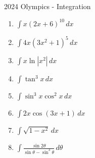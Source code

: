\documentclass[12pt, letterpaper]{article}
\begin{document}
2024 Olympics - Integration
\begin{enumerate}[itemsep=3cm]
    \item 
    $\int x(2x+6)^{10}\,dx$

    \item 
    $\int 4x(3x^2+1)^5\,dx$

    \item 
    $\int x \ln{|x^2|}\,dx$

    \item 
    $\int \tan^3{x}\,dx$

    \item 
    $\int \sin^3{x}\cos^2{x}\,dx$

    \item 
    $\int 2x \cos(3x+1)\,dx$

    \item 
    $\int \sqrt{1-x^2}\, dx$

    \item 
    $\int \frac{\sin{2\theta}}{\sin{\theta}-\sin^3{\theta}}\,d\theta$


\end{enumerate}
\end{document}
